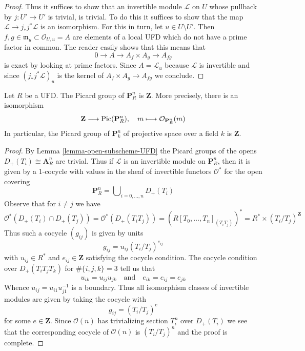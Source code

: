 \begin{proof}
\medskip\noindent
Thus it suffices to show that an invertible module $\mathcal{L}$
on $U$ whose pullback by $j : U' \to U'$ is trivial, is trivial.
To do this it suffices to show that the map
$\mathcal{L} \to j_*j^*\mathcal{L}$ is an isomorphism.
For this in turn, let $u \in U \setminus U'$. Then
$f, g \in \mathfrak m_u \subset \mathcal{O}_{U, u} = A$ are elements
of a local UFD which do not have a prime factor in common. The reader
easily shows that this means that
$$
0 \to A \to A_f \times A_g \to A_{fg}
$$
is exact by looking at prime factors. Since $A = \mathcal{L}_u$
because $\mathcal{L}$ is invertible and since $(j_*j^*\mathcal{L})_u$
is the kernel of $A_f \times A_g \to A_{fg}$ we conclude.
\end{proof}

\begin{lemma}
\label{lemma-Pic-projective-space-UFD}
Let $R$ be a UFD. The Picard group of $\mathbf{P}^n_R$
is $\mathbf{Z}$. More precisely, there is an isomorphism
$$
\mathbf{Z} \longrightarrow \mathop{\mathrm{Pic}}\nolimits(\mathbf{P}^n_R),\quad
m \longmapsto \mathcal{O}_{\mathbf{P}^n_R}(m)
$$
In particular, the Picard group of $\mathbf{P}^n_k$ of projective
space over a field $k$ is $\mathbf{Z}$.
\end{lemma}

\begin{proof}
By Lemma \ref{lemma-open-subscheme-UFD} the Picard groups of the opens
$D_+(T_i) \cong \mathbf{A}^n_R$ are trivial.
Thus if $\mathcal{L}$ is an invertible module on
$\mathbf{P}^n_R$, then it is given by a $1$-cocycle with values in
the sheaf of invertible functors $\mathcal{O}^*$ for the open covering
$$
\mathbf{P}^n_R = \bigcup\nolimits_{i = 0, \ldots, n} D_+(T_i)
$$
Observe that for $i \not = j$ we have
$$
\mathcal{O}^*(D_+(T_i) \cap D_+(T_j)) =
\mathcal{O}^*(D_+(T_iT_j)) = \left(R[T_0, \ldots, T_n]_{(T_iT_j)}\right)^* =
R^* \times (T_i/T_j)^\mathbf{Z}
$$
Thus such a cocycle $(g_{ij})$ is given by units
$$
g_{ij} = u_{ij} (T_i/T_j)^{e_{ij}}
$$
with $u_{ij} \in R^*$ and $e_{ij} \in \mathbf{Z}$
satisfying the cocycle condition. The cocycle condition
over $D_+(T_iT_jT_k)$ for $\#\{i, j, k\} = 3$ tell us that
$$
u_{ik} = u_{ij} u_{jk} \quad\text{and}\quad
e_{ik} = e_{ij} = e_{jk}
$$
Whence $u_{ij} = u_{i1} u_{j1}^{-1}$ is a boundary.
Thus all isomorphism classes of invertible modules
are given by taking the cocycle with
$$
g_{ij} = (T_i/T_j)^e
$$
for some $e \in \mathbf{Z}$. Since $\mathcal{O}(n)$ has trivializing
section $T_i^n$ over $D_+(T_i)$ we see that the corresponding
cocycle of $\mathcal{O}(n)$ is $(T_i/T_j)^n$ and the proof is complete.
\end{proof}






